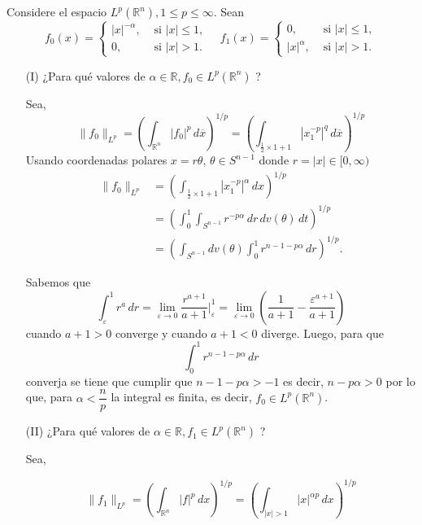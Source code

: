   Considere el espacio $L^p\left(\mathbb{R}^n\right), 1 \leq p \leq \infty$. Sean
$$
f_0(x)=\left\{\begin{array}{ll}
|x|^{-\alpha}, & \text { si }|x| \leq 1, \\
0, & \text { si }|x|>1 .
\end{array} \quad f_1(x)= \begin{cases}0, & \text { si }|x| \leq 1, \\
|x|^\alpha, & \text { si }|x|>1 .\end{cases}\right.
$$
\begin{itemize}
  \item[(I)] ¿Para qué valores de $\alpha \in \mathbb{R}, f_0 \in L^p\left(\mathbb{R}^n\right)$ ?\\
  \begin{sol}
Sea,
  \[
\| f_0 \|_{L^p} = \left( \int_{\mathbb{R}^n} |f_0|^p \, d\overline{x} \right)^{1/p} = \left( \int_{\frac{1}{2} \times 1+1} |x_1^{-p}|^q \, d\overline{x} \right)^{1/p}
\]
Usando coordenadas polares \( x = r\theta \), \( \theta \in S^{n-1} \) donde \( r = |x| \in [0, \infty) \)
\begin{align*}
  \| f_0 \|_{L^p} &= \left( \int_{\frac{1}{2} \times 1+1} |x_1^{-p}|^\alpha \, dx \right)^{1/p}\\
  & = \left( \int_0^1 \int_{S^{n-1}} r^{-p\alpha} \, dr \, dv(\theta) \, dt \right)^{1/p}\\ 
  &= \left( \int_{S^{n-1}} dv(\theta) \int_0^1 r^{n-1-p\alpha} \, dr \right)^{1/p}
.\end{align*}



Sabemos que
\[
\int_\varepsilon^1 r^a \, dr = \lim_{\varepsilon \to 0} \frac{r^{a+1}}{a+1} \bigg|_\varepsilon^1 = \lim_{\varepsilon \to 0} \left( \frac{1}{a+1} - \frac{\varepsilon^{a+1}}{a+1} \right)
\]
cuando \( a + 1 > 0 \) converge y cuando \( a + 1 < 0 \) diverge. Luego, para que 
\[
\int_0^1 r^{n-1-p\alpha} \, dr\]
converja se tiene que cumplir que $ n-1-p\alpha > -1 $ es decir, $n - p\alpha > 0$ por lo que, para \( \alpha < \dfrac{n}{p} \) la integral es finita, es decir, \( f_0 \in L^p(\mathbb{R}^n) \).
\end{sol}
\item[(II)] ¿Para qué valores de $\alpha \in \mathbb{R}, f_1 \in L^p\left(\mathbb{R}^n\right)$ ?\\
\begin{sol}
Sea,

\[
\| f_1 \|_{L^p} = \left( \int_{\mathbb{R}^n} |f|^p \, dx \right)^{1/p} = \left( \int_{|x|>1} |x|^{\alpha p} \, dx \right)^{1/p}
\]


\end{sol}
\end{itemize}
